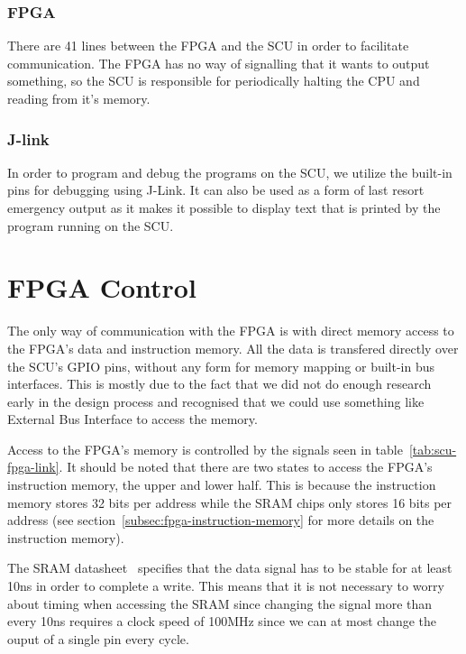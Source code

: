 \subsubsection{FPGA}
There are 41 lines between the FPGA and the SCU in order to facilitate communication.
The FPGA has no way of signalling that it wants to output something, so the SCU is responsible for periodically halting the CPU and reading from it's memory.

\subsubsection{J-link}
In order to program and debug the programs on the SCU, we utilize the built-in pins for debugging using J-Link\texttrademark.
It can also be used as a form of last resort emergency output as it makes it possible to display text that is printed by the program running on the SCU.

\section{FPGA Control}
The only way of communication with the FPGA is with direct memory access to the FPGA's data and instruction memory.
All the data is transfered directly over the SCU's GPIO pins, without any form for memory mapping or built-in bus interfaces.
This is mostly due to the fact that we did not do enough research early in the design process and recognised that we could use something like External Bus Interface to access the memory.

Access to the FPGA's memory is controlled by the signals seen in table~\ref{tab:scu-fpga-link}.
It should be noted that there are two states to access the FPGA's instruction memory, the upper and lower half.
This is because the instruction memory stores 32 bits per address while the SRAM chips only stores 16 bits per address (see section~\ref{subsec:fpga-instruction-memory} for more details on the instruction memory).

The SRAM datasheet~\cite{sram-datasheet} specifies that the data signal has to be stable for at least 10ns in order to complete a write.
This means that it is not necessary to worry about timing when accessing the SRAM since changing the signal more than every 10ns requires a clock speed of 100MHz since we can at most change the ouput of a single pin every cycle.

